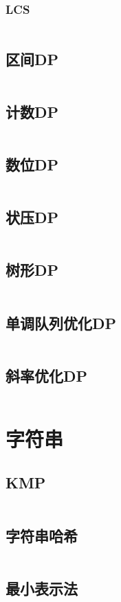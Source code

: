 \documentclass[a4paper,12pt]{article}
\begin{document}
\subsubsection{LCS}
\inputminted[breaklines]{c++}{dp/linear/lcs.cc}
\subsection{区间DP}
\inputminted[breaklines]{c++}{dp/interval.cc}
\subsection{计数DP}
\inputminted[breaklines]{c++}{dp/jishu.cc}
\subsection{数位DP}
\inputminted[breaklines]{c++}{dp/shuwei.cc}
\subsection{状压DP}
\inputminted[breaklines]{c++}{dp/zhuangya.cc}
\subsection{树形DP}
\inputminted[breaklines]{c++}{dp/treedp.cc}
\subsection{单调队列优化DP}
\inputminted[breaklines]{c++}{dp/dddl.cc}
\subsection{斜率优化DP}
\inputminted[breaklines]{c++}{dp/xielv.cc}


\newpage
\section{字符串}
\subsection{KMP}
\inputminted[breaklines]{c++}{string/kmp.cc}
\subsection{字符串哈希}
\inputminted[breaklines]{c++}{string/hash.cc}
\subsection{最小表示法}
\inputminted[breaklines]{c++}{string/minimal.cc}
\end{document}
